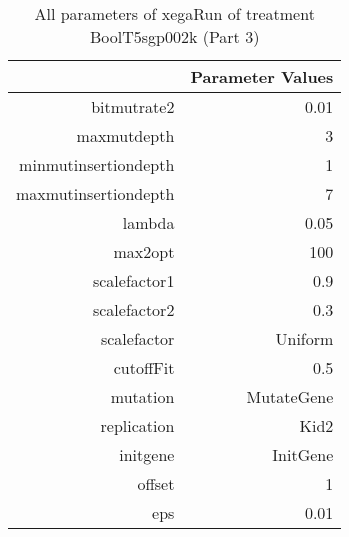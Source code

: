 \begin{table}[ht]
\centering
\begin{tabular}{rr}
  \hline
 & Parameter Values \\ 
  \hline
bitmutrate2 & 0.01 \\ 
  maxmutdepth & 3 \\ 
  minmutinsertiondepth & 1 \\ 
  maxmutinsertiondepth & 7 \\ 
  lambda & 0.05 \\ 
  max2opt & 100 \\ 
  scalefactor1 & 0.9 \\ 
  scalefactor2 & 0.3 \\ 
  scalefactor & Uniform \\ 
  cutoffFit & 0.5 \\ 
  mutation & MutateGene \\ 
  replication & Kid2 \\ 
  initgene & InitGene \\ 
  offset & 1 \\ 
  eps & 0.01 \\ 
   \hline
\end{tabular}
\caption{ All parameters of xegaRun of treatment BoolT5sgp002k 
 (Part 3)} 
\end{table}
